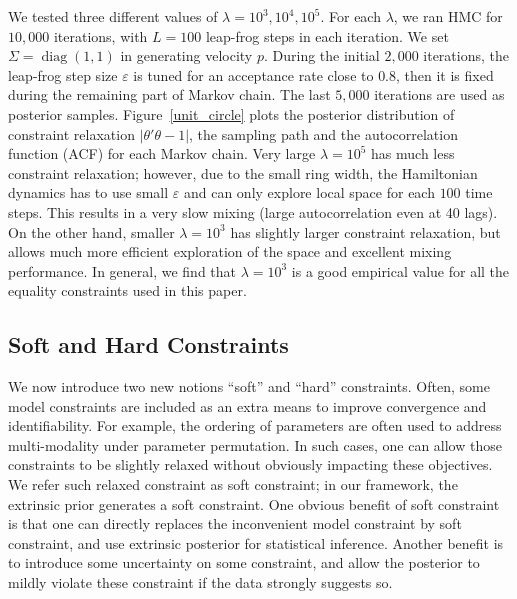 \documentclass[10pt]{article}
\newcommand{\leo}[1]{{\color{blue}{\it leo: #1}}}
\DeclareMathOperator{\diag}{diag}
\DeclareMathOperator{\1}{\mathbbm{1}}
\begin{document}
We tested three different values of $\lambda = 10^3,10^4,10^5$. For each $\lambda$, we ran HMC for $10,000$ iterations, with $L=100$ leap-frog steps in each iteration. 
We set $\Sigma= \diag(1,1)$ in generating velocity $p$. During the initial $2,000$ iterations, the leap-frog step size $\varepsilon$ is tuned for an acceptance rate close to $0.8$, then it is fixed during the remaining part of Markov chain. The last $5,000$ iterations are used as posterior samples. Figure~\ref{unit_circle} plots the posterior distribution of constraint relaxation $|\theta'\theta -1|$, the sampling path and the autocorrelation function (ACF) for each Markov chain. Very large $\lambda=10^5$ has much less constraint relaxation; however, due to the small ring width, the Hamiltonian dynamics has to use small $\varepsilon$ and can only explore local space for each $100$ time steps. This results in a very slow mixing (large autocorrelation even at 40 lags). On the other hand, smaller $\lambda=10^3$ has slightly larger constraint relaxation, but allows much more efficient exploration of the space and excellent mixing performance. In general, we find that $\lambda=10^3$ is a good empirical value for all the equality constraints used in this paper.

\subsection{Soft and Hard Constraints}

We now introduce two new notions ``soft'' and ``hard'' constraints. Often, some model constraints are included as an extra means to improve convergence and identifiability. For example, the ordering of parameters are often used to address multi-modality under parameter permutation. In such cases, one can allow those constraints to be slightly relaxed without obviously impacting these objectives. We refer such relaxed constraint as soft constraint; in our framework, the extrinsic prior generates a soft constraint. One obvious benefit of soft constraint is that one can directly replaces the inconvenient model constraint by soft constraint, and use extrinsic posterior for statistical inference. Another benefit is to introduce some uncertainty on some constraint, and  allow the posterior to mildly violate these constraint if the data strongly suggests so.

\end{document}
